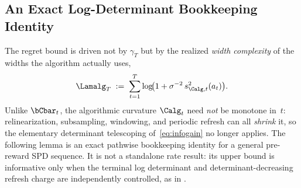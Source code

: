 \FloatBarrier %


\subsection{An Exact Log-Determinant Bookkeeping Identity}\label{sec:dynamic-potential}

The regret bound is driven not by $\gamma_T$ but by the realized
\emph{width complexity} of the widths the algorithm actually uses,
\begin{equation}\label{eq:lam-alg}
  \Lamalg_T \;:=\; \sum_{t=1}^T
  \log\!\bigl(1+\sigma^{-2}\,s_{\Calg,t}^2(a_t)\bigr).
\end{equation}
Unlike $\bCbar_t$, the algorithmic curvature $\Calg_t$ need \emph{not} be
monotone in~$t$: relinearization, subsampling, windowing, and periodic
refresh can all \emph{shrink} it, so the elementary determinant
telescoping of~\eqref{eq:infogain} no longer applies.  The following lemma is an
exact pathwise bookkeeping identity for a general pre-reward SPD sequence.  It
is not a standalone rate result: its upper bound is informative only when the
terminal log determinant and determinant-decreasing refresh charge are
independently controlled, as in .

